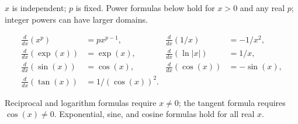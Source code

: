 \documentclass[11pt,oneside,openany]{book}
\begin{document}
\begin{minipage}[t]{0.485\textwidth}

\(x\) is independent; \(p\) is fixed. Power formulas below hold for \(x>0\) and any
real \(p\); integer powers can have larger domains.

\[
\begin{aligned}
\frac{d}{dx}(x^p)&=px^{p-1},&
\frac{d}{dx}(1/x)&=-1/x^2,\\
\frac{d}{dx}(\exp(x))&=\exp(x),&
\frac{d}{dx}(\ln|x|)&=1/x,\\
\frac{d}{dx}(\sin(x))&=\cos(x),&
\frac{d}{dx}(\cos(x))&=-\sin(x),\\
\frac{d}{dx}(\tan(x))&=1/(\cos(x))^2.
\end{aligned}
\]

Reciprocal and logarithm formulas require \(x\ne0\); the tangent formula requires
\(\cos(x)\ne0\). Exponential, sine, and cosine formulas hold for all real \(x\).
\end{minipage}%
\hfill%
\end{document}
